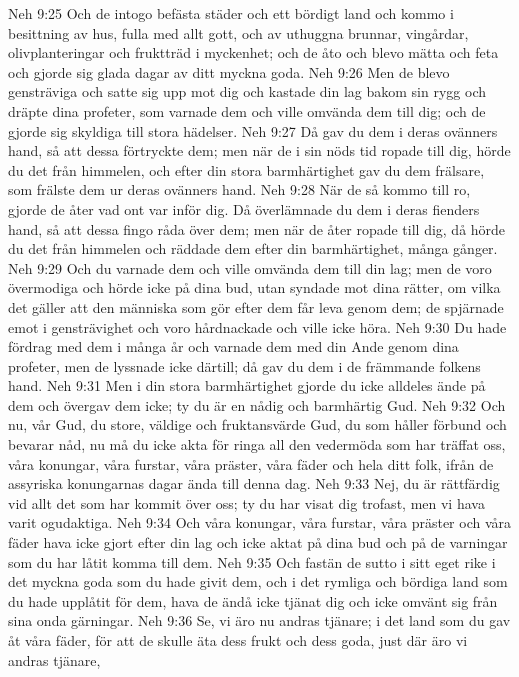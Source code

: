 Neh 9:25  Och de intogo befästa städer och ett bördigt land och kommo i besittning av hus, fulla med allt gott, och av uthuggna brunnar, vingårdar, olivplanteringar och fruktträd i myckenhet; och de åto och blevo mätta och feta och gjorde sig glada dagar av ditt myckna goda.
Neh 9:26  Men de blevo gensträviga och satte sig upp mot dig och kastade din lag bakom sin rygg och dräpte dina profeter, som varnade dem och ville omvända dem till dig; och de gjorde sig skyldiga till stora hädelser.
Neh 9:27  Då gav du dem i deras ovänners hand, så att dessa förtryckte dem; men när de i sin nöds tid ropade till dig, hörde du det från himmelen, och efter din stora barmhärtighet gav du dem frälsare, som frälste dem ur deras ovänners hand.
Neh 9:28  När de så kommo till ro, gjorde de åter vad ont var inför dig. Då överlämnade du dem i deras fienders hand, så att dessa fingo råda över dem; men när de åter ropade till dig, då hörde du det från himmelen och räddade dem efter din barmhärtighet, många gånger.
Neh 9:29  Och du varnade dem och ville omvända dem till din lag; men de voro övermodiga och hörde icke på dina bud, utan syndade mot dina rätter, om vilka det gäller att den människa som gör efter dem får leva genom dem; de spjärnade emot i gensträvighet och voro hårdnackade och ville icke höra.
Neh 9:30  Du hade fördrag med dem i många år och varnade dem med din Ande genom dina profeter, men de lyssnade icke därtill; då gav du dem i de främmande folkens hand.
Neh 9:31  Men i din stora barmhärtighet gjorde du icke alldeles ände på dem och övergav dem icke; ty du är en nådig och barmhärtig Gud.
Neh 9:32  Och nu, vår Gud, du store, väldige och fruktansvärde Gud, du som håller förbund och bevarar nåd, nu må du icke akta för ringa all den vedermöda som har träffat oss, våra konungar, våra furstar, våra präster, våra fäder och hela ditt folk, ifrån de assyriska konungarnas dagar ända till denna dag.
Neh 9:33  Nej, du är rättfärdig vid allt det som har kommit över oss; ty du har visat dig trofast, men vi hava varit ogudaktiga.
Neh 9:34  Och våra konungar, våra furstar, våra präster och våra fäder hava icke gjort efter din lag och icke aktat på dina bud och på de varningar som du har låtit komma till dem.
Neh 9:35  Och fastän de sutto i sitt eget rike i det myckna goda som du hade givit dem, och i det rymliga och bördiga land som du hade upplåtit för dem, hava de ändå icke tjänat dig och icke omvänt sig från sina onda gärningar.
Neh 9:36  Se, vi äro nu andras tjänare; i det land som du gav åt våra fäder, för att de skulle äta dess frukt och dess goda, just där äro vi andras tjänare,
